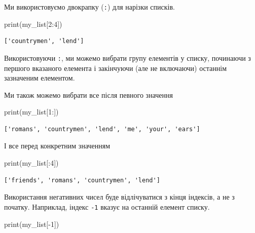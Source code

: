 \documentclass[
  letterpaper,
]{report}
\newenvironment{Shaded}{\begin{snugshade}}{\end{snugshade}}
\newcommand{\BuiltInTok}[1]{\textcolor[rgb]{0.00,0.23,0.31}{#1}}
\newcommand{\DecValTok}[1]{\textcolor[rgb]{0.68,0.00,0.00}{#1}}
\newcommand{\NormalTok}[1]{\textcolor[rgb]{0.00,0.23,0.31}{#1}}
\newcommand{\OperatorTok}[1]{\textcolor[rgb]{0.37,0.37,0.37}{#1}}
\begin{document}
Ми використовуємо двокрапку (\texttt{:}) для нарізки списків.

\begin{Shaded}
\begin{Highlighting}[]
\BuiltInTok{print}\NormalTok{(my\_list[}\DecValTok{2}\NormalTok{:}\DecValTok{4}\NormalTok{])}
\end{Highlighting}
\end{Shaded}

\begin{verbatim}
['countrymen', 'lend']
\end{verbatim}

Використовуючи \texttt{:}, ми можемо вибрати групу елементів у списку,
починаючи з першого вказаного елемента і закінчуючи (але не включаючи)
останнім зазначеним елементом.

Ми також можемо вибрати все після певного значення

\begin{Shaded}
\begin{Highlighting}[]
\BuiltInTok{print}\NormalTok{(my\_list[}\DecValTok{1}\NormalTok{:])}
\end{Highlighting}
\end{Shaded}

\begin{verbatim}
['romans', 'countrymen', 'lend', 'me', 'your', 'ears']
\end{verbatim}

І все перед конкретним значенням

\begin{Shaded}
\begin{Highlighting}[]
\BuiltInTok{print}\NormalTok{(my\_list[:}\DecValTok{4}\NormalTok{])}
\end{Highlighting}
\end{Shaded}

\begin{verbatim}
['friends', 'romans', 'countrymen', 'lend']
\end{verbatim}

Використання негативних чисел буде відлічуватися з кінця індексів, а не
з початку. Наприклад, індекс \texttt{-1} вказує на останній елемент
списку.

\begin{Shaded}
\begin{Highlighting}[]
\BuiltInTok{print}\NormalTok{(my\_list[}\OperatorTok{{-}}\DecValTok{1}\NormalTok{])}
\end{Highlighting}
\end{Shaded}
\end{document}
